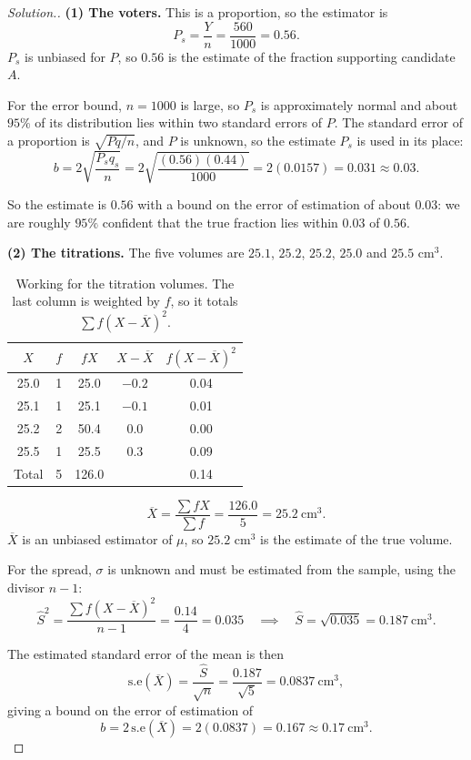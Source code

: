 \documentclass[11pt,a4paper]{article}
\theoremstyle{definition}
\newenvironment{solution}
  {\renewcommand{\qedsymbol}{}\begin{proof}[\textit{Solution}.]}
  {\end{proof}}
\begin{document}
\begin{solution}
\textbf{(1) The voters.} This is a proportion, so the estimator is
\[P_s=\frac{Y}{n}=\frac{560}{1000}=0.56.\]
$P_s$ is unbiased for $P$, so $0.56$ is the estimate of the fraction supporting candidate $A$.

For the error bound, $n=1000$ is large, so $P_s$ is approximately normal and about $95\%$ of
its distribution lies within two standard errors of $P$. The standard error of a proportion is
$\sqrt{Pq/n}$, and $P$ is unknown, so the estimate $P_s$ is used in its place:
\[b=2\sqrt{\frac{P_sq_s}{n}}=2\sqrt{\frac{(0.56)(0.44)}{1000}}=2(0.0157)=0.031\approx 0.03.\]

So the estimate is $0.56$ with a bound on the error of estimation of about $0.03$: we are
roughly $95\%$ confident that the true fraction lies within $0.03$ of $0.56$.

\textbf{(2) The titrations.} The five volumes are $25.1$, $25.2$, $25.2$, $25.0$ and $25.5$
cm$^3$.
\begin{table}[H]
\centering
\begin{tabular}{|c|c|c|c|c|}
\hline
$X$ & $f$ & $fX$ & $X-\overline{X}$ & $f(X-\overline{X})^2$\\
\hline
25.0 & 1 & 25.0 & $-0.2$ & 0.04\\
25.1 & 1 & 25.1 & $-0.1$ & 0.01\\
25.2 & 2 & 50.4 & 0.0 & 0.00\\
25.5 & 1 & 25.5 & 0.3 & 0.09\\
\hline
Total & 5 & 126.0 & & 0.14\\
\hline
\end{tabular}
\caption{Working for the titration volumes. The last column is weighted by $f$, so it totals $\sum f(X-\overline{X})^2$.}
\end{table}

\[\overline{X}=\frac{\sum fX}{\sum f}=\frac{126.0}{5}=25.2\ \text{cm}^3.\]
$\overline{X}$ is an unbiased estimator of $\mu$, so $25.2$ cm$^3$ is the estimate of the true
volume.

For the spread, $\sigma$ is unknown and must be estimated from the sample, using the divisor
$n-1$:
\[\hat{S}^2=\frac{\sum f(X-\overline{X})^2}{n-1}=\frac{0.14}{4}=0.035
\quad\implies\quad \hat{S}=\sqrt{0.035}=0.187\ \text{cm}^3.\]

The estimated standard error of the mean is then
\[\text{s.e}(\overline{X})=\frac{\hat{S}}{\sqrt{n}}=\frac{0.187}{\sqrt{5}}=0.0837\ \text{cm}^3,\]
giving a bound on the error of estimation of
\[b=2\,\text{s.e}(\overline{X})=2(0.0837)=0.167\approx 0.17\ \text{cm}^3.\]


\end{solution}
\end{document}
